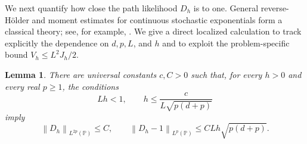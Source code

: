 \documentclass[11pt]{article}
\newtheorem{lemma}[lemma]{Lemma}
\newcommand{\norm}[1]{\left\lVert #1\right\rVert}
\newcommand{\1}{\mathbf 1}
\begin{document}
	We next quantify how close the path likelihood \(D_h\) is to one.
	General reverse-H\"older and moment estimates for continuous stochastic
	exponentials form a classical theory; see, for example,
	\citet[Chapters~1 and~3]{Kazamaki1994}.  We give a direct localized
	calculation to track explicitly the dependence on $d,p,L$, and $h$ and to
	exploit the problem-specific bound $V_h\leq L^2J_h/2$.
	
	\begin{lemma}\label{lem:path-likelihood}
		There are universal constants \(c,C>0\) such that, for every \(h>0\) and
		every real \(p\geq 1\), the conditions
		\begin{equation}\label{eq:D-moment-condition}
			Lh<1,
			\qquad
			h\leq\frac{c}{L\sqrt{p(d+p)}}
		\end{equation}
		imply
		\begin{equation}\label{eq:D-moments}
			\norm{D_h}_{L^{2p}(\mathbb P)}\leq C,
			\qquad
			\norm{D_h-1}_{L^p(\mathbb P)}
			\leq CLh\sqrt{p(d+p)}.
		\end{equation}
	\end{lemma}
	
\end{document}
